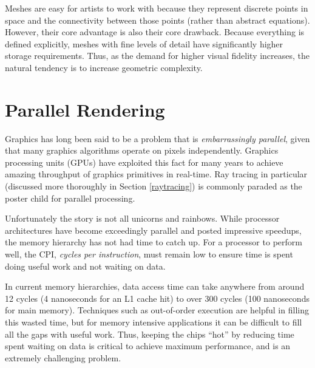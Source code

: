 \documentclass[12pt]{ucthesis}
\begin{document}
Meshes are easy for artists to work with because they represent discrete
points in space and the connectivity between those points (rather than abstract
equations). However, their core advantage is also their core drawback. Because
everything is defined explicitly, meshes with fine levels of detail have
significantly higher storage requirements. Thus, as the demand for higher
visual fidelity increases, the natural tendency is to increase geometric
complexity.

\section{Parallel Rendering}
\label{parallel}

Graphics has long been said to be a problem that is \emph{embarrassingly parallel},
given that many graphics algorithms operate on pixels independently. Graphics
processing units (GPUs) have exploited this fact for many years to achieve
amazing throughput of graphics primitives in real-time. Ray tracing in
particular (discussed more thoroughly in Section \ref{raytracing}) is commonly
paraded as the poster child for parallel processing.

Unfortunately the story is not all unicorns and rainbows. While processor
architectures have become exceedingly parallel and posted impressive
speedups, the memory hierarchy has not had time to catch up. For a processor
to perform well, the CPI, \emph{cycles per instruction}, must remain low to
ensure time is spent doing useful work and not waiting on data.

In current memory hierarchies, data access time can take anywhere from around
12 cycles (4 nanoseconds for an L1 cache hit) to over 300 cycles (100
nanoseconds for main memory). Techniques such as out-of-order execution are
helpful in filling this wasted time, but for memory intensive applications it
can be difficult to fill all the gaps with useful work. Thus, keeping the chips
``hot'' by reducing time spent waiting on data is critical to achieve maximum
performance, and is an extremely challenging problem.
\end{document}
